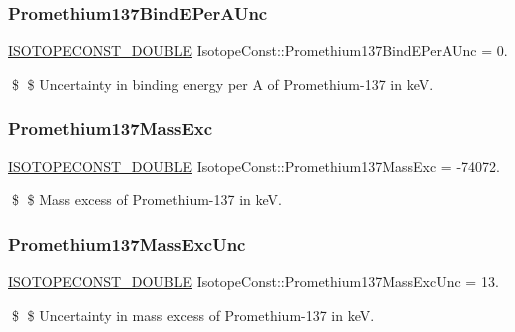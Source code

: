 \subsubsection{\texorpdfstring{Promethium137\+Bind\+E\+Per\+A\+Unc}{Promethium137BindEPerAUnc}}
{\footnotesize\ttfamily \mbox{\hyperlink{group___isotope_const-_macros_ga8f45a7272ce02c0b4c65c44636ed719a}{I\+S\+O\+T\+O\+P\+E\+C\+O\+N\+S\+T\+\_\+\+D\+O\+U\+B\+LE}} Isotope\+Const\+::\+Promethium137\+Bind\+E\+Per\+A\+Unc = 0.}

\$ \$ Uncertainty in binding energy per A of Promethium-\/137 in keV. \mbox{\label{group___isotope_const-_promethium-_pm137_gac082ec70653d9fb353a7e02b0d423b51}} 
\subsubsection{\texorpdfstring{Promethium137\+Mass\+Exc}{Promethium137MassExc}}
{\footnotesize\ttfamily \mbox{\hyperlink{group___isotope_const-_macros_ga8f45a7272ce02c0b4c65c44636ed719a}{I\+S\+O\+T\+O\+P\+E\+C\+O\+N\+S\+T\+\_\+\+D\+O\+U\+B\+LE}} Isotope\+Const\+::\+Promethium137\+Mass\+Exc = -\/74072.}

\$ \$ Mass excess of Promethium-\/137 in keV. \mbox{\label{group___isotope_const-_promethium-_pm137_ga842ea49569f34d89c58ec6458dba405b}} 
\subsubsection{\texorpdfstring{Promethium137\+Mass\+Exc\+Unc}{Promethium137MassExcUnc}}
{\footnotesize\ttfamily \mbox{\hyperlink{group___isotope_const-_macros_ga8f45a7272ce02c0b4c65c44636ed719a}{I\+S\+O\+T\+O\+P\+E\+C\+O\+N\+S\+T\+\_\+\+D\+O\+U\+B\+LE}} Isotope\+Const\+::\+Promethium137\+Mass\+Exc\+Unc = 13.}

\$ \$ Uncertainty in mass excess of Promethium-\/137 in keV. \mbox{\label{group___isotope_const-_promethium-_pm137_gaf31e7d6da13536f6bc7d712ca8cf61bd}} 
